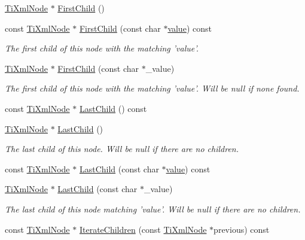 \begin{DoxyCompactItemize}
\hyperlink{class_ti_xml_node}{TiXmlNode} $\ast$ \hyperlink{class_ti_xml_node_a5e97d69b7c0ebd27fb7286be56559b77}{FirstChild} ()
\item 
const \hyperlink{class_ti_xml_node}{TiXmlNode} $\ast$ \hyperlink{class_ti_xml_node_ab5f722624113c8203227de4f56576d31}{FirstChild} (const char $\ast$\hyperlink{class_ti_xml_node_ab068eb0e3311ba1b5a132abe60a9c3c8}{value}) const 
\begin{DoxyCompactList}\small\item\em The first child of this node with the matching 'value'. \end{DoxyCompactList}\item 
\hyperlink{class_ti_xml_node}{TiXmlNode} $\ast$ \hyperlink{class_ti_xml_node_abc8bf32be6419ec453a731868de19554}{FirstChild} (const char $\ast$\_\-value)
\begin{DoxyCompactList}\small\item\em The first child of this node with the matching 'value'. Will be null if none found. \end{DoxyCompactList}\item 
const \hyperlink{class_ti_xml_node}{TiXmlNode} $\ast$ \hyperlink{class_ti_xml_node_a6d671107e00cca1d28cb2d7f3a87a21e}{LastChild} () const 
\item 
\hyperlink{class_ti_xml_node}{TiXmlNode} $\ast$ \hyperlink{class_ti_xml_node_a6432d2b2495f6caf9cb4278df706a031}{LastChild} ()
\begin{DoxyCompactList}\small\item\em The last child of this node. Will be null if there are no children. \end{DoxyCompactList}\item 
const \hyperlink{class_ti_xml_node}{TiXmlNode} $\ast$ \hyperlink{class_ti_xml_node_acdd3fdc436aa7433023310a041e5e63f}{LastChild} (const char $\ast$\hyperlink{class_ti_xml_node_ab068eb0e3311ba1b5a132abe60a9c3c8}{value}) const 
\item 
\hyperlink{class_ti_xml_node}{TiXmlNode} $\ast$ \hyperlink{class_ti_xml_node_a108b7e1fdef1f6b596dfbbfd5cca6083}{LastChild} (const char $\ast$\_\-value)
\begin{DoxyCompactList}\small\item\em The last child of this node matching 'value'. Will be null if there are no children. \end{DoxyCompactList}\item 
const \hyperlink{class_ti_xml_node}{TiXmlNode} $\ast$ \hyperlink{class_ti_xml_node_aaef7ac3978c4bb1cc8a24ffae7bced75}{IterateChildren} (const \hyperlink{class_ti_xml_node}{TiXmlNode} $\ast$previous) const 

\end{DoxyCompactItemize}
